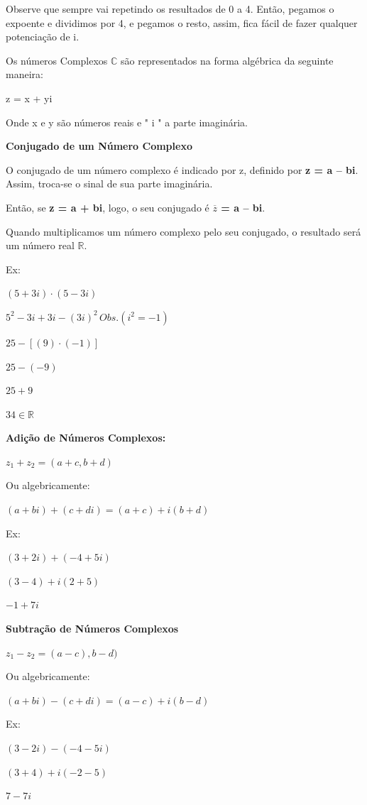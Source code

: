 \begin{multicols*}{2}
    Observe que sempre vai repetindo os resultados de 0 a 4. Então, pegamos o expoente e dividimos por 4, e pegamos o resto, assim, fica fácil de fazer qualquer potenciação de i.

    Os números Complexos $\mathbb{C}$ são representados na forma algébrica da seguinte maneira:

    z = x + yi

    Onde x e y são números reais e " i " a parte imaginária.

    \textbf{Conjugado de um Número Complexo}

    O conjugado de um número complexo é indicado por z, definido por \textbf{z = a – bi}. Assim, troca-se o sinal de sua parte imaginária.

    Então, se \textbf{z = a + bi}, logo, o seu conjugado é \textbf{$\overline{z}$ = a – bi}.

    Quando multiplicamos um número complexo pelo seu conjugado, o resultado será um número real $\mathbb{R}$.

    Ex:

    $ (5 + 3i) \cdot (5 - 3i) $

    $ 5^2 - 3i + 3i - (3i)^2 \, Obs. (i^2 = -1)$

    $ 25 - [(9) \cdot (-1)] $

    $ 25 - (-9)$

    $ 25 + 9 $

    $ 34 \in \mathbb{R}$

    \textbf{Adição de Números Complexos:}

    $ z_1 + z_2 = ( a + c, b + d)$

    Ou algebricamente:

    $(a + bi) + (c + di) = (a + c) + i(b + d)$

    Ex:

    $(3 + 2i) + (-4 + 5i)$

    $(3 - 4) + i(2 + 5)$

    $ -1 + 7i$

    \textbf{Subtração de Números Complexos}

    $z_1 - z_2 = (a -c), b -d)$

    Ou algebricamente:

    $(a + bi) - (c + di) = (a - c) + i(b - d)$

    Ex:

    $(3 - 2i) - (-4 - 5i)$

    $(3 + 4) + i(-2 - 5)$

    $ 7 - 7i$


\end{multicols*}
